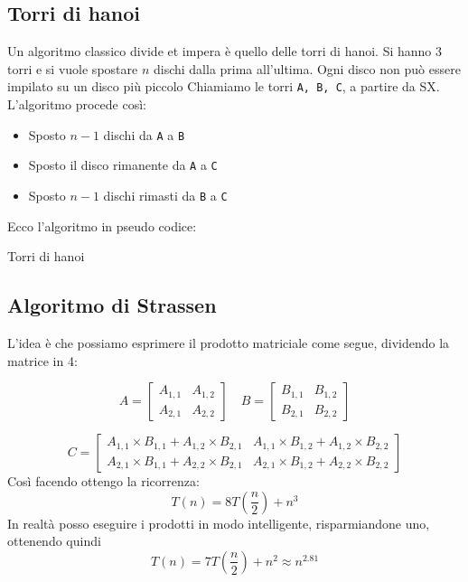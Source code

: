 \subsection{Torri di hanoi}
Un algoritmo classico divide et impera è quello delle torri di hanoi. Si hanno 3 torri e si vuole spostare $ n $ dischi dalla prima all'ultima. Ogni disco non può essere impilato su un disco più piccolo
\vskip3mm
Chiamiamo le torri \verb|A, B, C|, a partire da SX. L'algoritmo procede così:
\begin{itemize}
	\item Sposto $ n-1 $ dischi da \verb|A| a \verb|B|
	\item Sposto il disco rimanente da \verb|A| a \verb|C|
	\item Sposto $ n-1 $ dischi rimasti da \verb|B| a \verb|C|
\end{itemize}
Ecco l'algoritmo in pseudo codice:


\begin{algoritmo} {Torri di hanoi}
	\begin{algorithm}[H]
	\end{algorithm}
\end{algoritmo}
\subsection{Algoritmo di Strassen}
L'idea è che possiamo esprimere il prodotto matriciale come segue, dividendo la matrice in 4:

\[
	A = \begin{bmatrix}
		A_{1,1} & A_{1,2} \\
		A_{2,1} & A_{2,2}
	\end{bmatrix} \quad
	B = \begin{bmatrix}
		B_{1,1} & B_{1,2} \\
		B_{2,1} & B_{2,2}
	\end{bmatrix}
\]


\[
	C = \begin{bmatrix}
		A_{1,1} \times B_{1,1} + A_{1,2} \times B_{2,1} & A_{1,1} \times B_{1,2} + A_{1,2} \times B_{2,2} \\
		A_{2,1} \times B_{1,1} + A_{2,2} \times B_{2,1} & A_{2,1} \times B_{1,2} + A_{2,2} \times B_{2,2}
	\end{bmatrix}
\]
Così facendo ottengo la ricorrenza:
\[
	T\left(n\right) = 8 T\left(\frac{n}{2}\right) + n^3
\]
In realtà posso eseguire i prodotti in modo intelligente, risparmiandone uno, ottenendo quindi
\[
	T\left(n\right) = 7 T\left(\frac{n}{2}\right) + n^2 \approx n^{2.81}
\]




